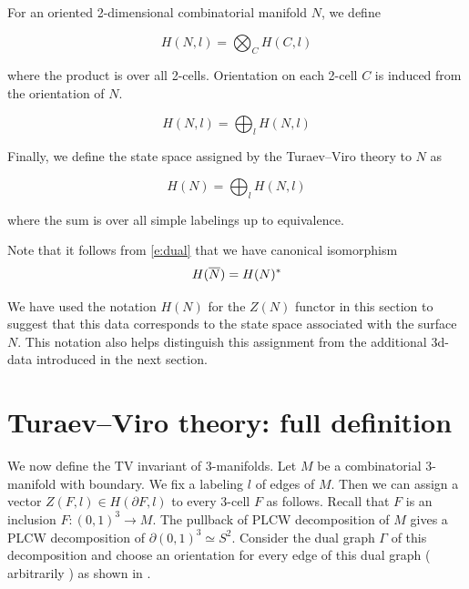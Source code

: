 For an oriented 2-dimensional combinatorial manifold $N$, we define

\begin{equation}
	H(N, l)= \bigotimes_{C} H(C, l)
\end{equation}

where the product is over all 2-cells. Orientation on each 2-cell $C$ is induced from the orientation of $N$.

\begin{equation}
	H(N,l)=\bigoplus_l H(N,l)
\end{equation}

Finally, we define the state space assigned by the Turaev--Viro theory to $N$ as

\begin{equation}\label{d:TV-surface}
	H(N)= \bigoplus_l H(N,l)
\end{equation}

where the sum is over all simple labelings up to equivalence.

Note that it follows from \eqref{e:dual} that we have canonical isomorphism
\begin{equation}\label{e:H-duality}
	H(\overline{N}) = H(N)^*
\end{equation}

 We have used the notation $H(N)$ for the $Z(N)$ functor in this section to suggest that this data corresponds to 
 the state space associated with the surface $N$. This notation also helps distinguish this assignment from the additional 
 3d-data introduced in the next section.

\section{Turaev--Viro theory: full definition}\label{s:tv-full-definition}
We now define the TV invariant of 3-manifolds. Let $M$ be a combinatorial 3-manifold with boundary. We fix a labeling $l$
 of edges of $M$. Then we can assign a vector $Z(F,l) \in H(\partial F, l)$ to  every 3-cell $F$ as follows. Recall that $F$ is an
  inclusion $F:(0,1)^3 \rightarrow M$. The pullback of PLCW decomposition of $M$ gives a PLCW decomposition of 
  $\partial (0,1)^3 \simeq S^2$. Consider the dual graph $\Gamma$ of this decomposition and choose an orientation for every 
  edge of this dual graph ( arbitrarily ) as shown in .

